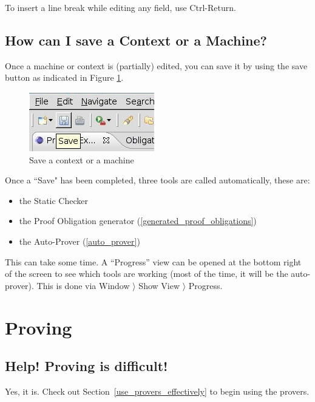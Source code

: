 To insert a line break while editing any field, use Ctrl-Return.

\subsection{How can I save a Context or a Machine?}

Once a machine or context is (partially) edited, you can save it by using the save button as indicated in Figure \ref{fig_faq_saveaction}.

\begin{figure}[!ht]
\begin{center}
	\includegraphics{img/faq/faq_saveaction.png}
	\caption{Save a context or a machine}
	\label{fig_faq_saveaction}
\end{center}
\end{figure}

Once a ``Save" has been completed, three tools are called automatically, these are:

\begin{itemize}
	\item the Static Checker
	\item the Proof Obligation generator (\ref{generated_proof_obligations})
	\item the Auto-Prover (\ref{auto_prover})
\end{itemize}

This can take some time. A ``Progress'' view can be opened at the bottom right of the screen to see which tools are working (most of the time, it will be the auto-prover).  This is done via Window $\rangle$ Show View $\rangle$ Progress.

\section{Proving}

\subsection{Help!  Proving is difficult!}

Yes, it is.  Check out Section~\ref{use_provers_effectively} to begin using the provers.

